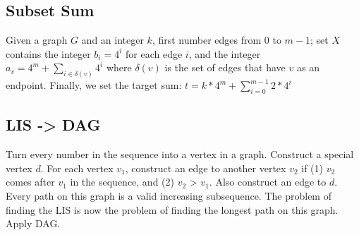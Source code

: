\subsection{Subset Sum}

Given a graph $G$ and an integer $k$, first number edges from 0 to $m-1$; set $X$ contains the integer $b_{i} = 4^{i}$ for each edge $i$, and the integer $a_{v} = 4^{m} + \sum_{i \in \delta(v)}{4^i}$ where $\delta(v)$ is the set of edges that have $v$ as an endpoint. Finally, we set the target sum: $t = k * 4^m + \sum_{i = 0}^{m-1}{2 * 4^i}$

\subsection{LIS -> DAG}

Turn every number in the sequence into a vertex in a graph. Construct a special vertex $d$. For each vertex $v_1$, construct an edge to another vertex $v_2$ if (1) $v_2$ comes after $v_1$ in the sequence, and (2) $v_2$ > $v_1$. Also construct an edge to $d$.\\ 

Every path on this graph is a valid increasing subsequence. The problem of finding the LIS is now the problem of finding the longest path on this graph. Apply DAG.